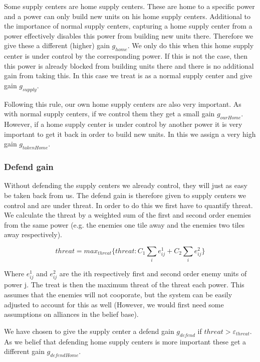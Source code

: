\documentclass[a4paper]{article} %
\begin{document}
Some supply centers are home supply centers. These are home to a specific power and a power can only build new units on his home supply centers. Additional to the importance of normal supply centers, capturing a home supply center from a power effectively disables this power from building new units there. Therefore we give these a different (higher) gain $g_{home}$. We only do this when this home supply center is under control by the corresponding power. If this is not the case, then this power is already blocked from building units there and there is no additional gain from taking this. In this case we treat is as a normal supply center and give gain $g_{supply}$.

Following this rule, our own home supply centers are also very important. As with normal supply centers, if we control them they get a small gain $g_{ourHome}$. However, if a home supply center is under control by another power it is very important to get it back in order to build new units. In this we assign a very high gain $g_{takenHome}$. 

\subsubsection{Defend gain}
\label{sec:defendgain}
Without defending the supply centers we already control, they will just as easy be taken back from us. The defend gain is therefore given to supply centers we control and are under threat. In order to do this we first have to quantify threat. We calculate the threat by a weighted sum of the first and second order enemies from the same power (e.g. the enemies one tile away and the enemies two tiles away respectively). 

$$threat = max_{threat}\{ threat : C_1 \sum_{i} e^{1}_{ij} + C_2 \sum_{i} e^{2}_{ij}\}$$

Where $e^1_{ij}$ and $e^2_{ij}$ are the ith respectively first and second order enemy units of power j. The treat is then the maximum threat of the threat each power. This assumes that the enemies will not cooporate, but the system can be easily adjusted to account for this as well (However, we would first need some assumptions on  alliances in the belief base). 

We have chosen to give the supply center a defend gain $g_{defend}$ if $threat > \varepsilon_{threat}$. As we belief that defending home supply centers is more important these get a different gain $g_{defendHome}$. 
\end{document}
